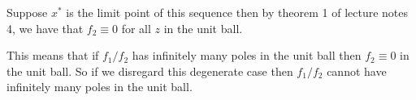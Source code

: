 \documentclass{unswmaths}
\begin{document}
Suppose $ x^* $ is the limit point of this sequence then by theorem 1 of lecture notes 4, we have that $ f_2 \equiv 0 $ for all $ z $ in the unit ball. 

This means that if $ f_1 / f_2 $ has infinitely many poles in the unit ball then $ f_2 \equiv 0 $ in the unit ball. So if we disregard this degenerate case then $ f_1 / f_2 $ cannot have infinitely many poles in the unit ball.

\section{}
\end{document}
